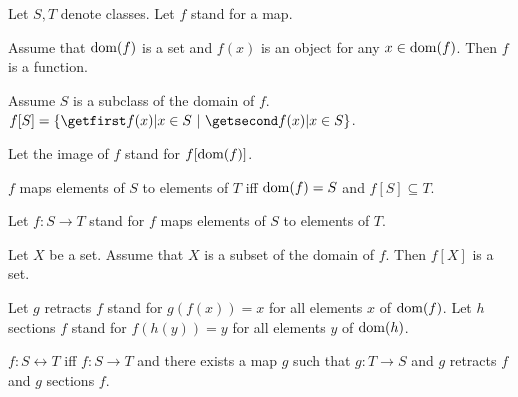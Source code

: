 \documentclass[english,11pt]{article}
\begin{document}
\begin{forthel}
  Let $S, T$ denote classes.
  Let $f$ stand for a map.

  \begin{axiom}
    Assume that $\operatorname{dom}(f)$ is a set and $f(x)$ is an object for any
    $x \in \operatorname{dom}(f)$.
    Then $f$ is a function.
  \end{axiom}

  \begin{definition}
    Assume $S$ is a subclass of the domain of $f$.
    $f[S] = \class{f(x) | x \in S}$.
  \end{definition}

  Let the image of $f$ stand for $f[\operatorname{dom}(f)]$.

  \begin{definition}
    $f$ maps elements of $S$ to elements of $T$ iff $\operatorname{dom}(f) = S$ and $f[S]
    \subseteq T$.
  \end{definition}

  Let $f : S \rightarrow T$ stand for $f$ maps elements of $S$ to elements of
  $T$.

  \begin{axiom}[title=Replacement Axiom]
    Let $X$ be a set.
    Assume that $X$ is a subset of the domain of $f$.
    Then $f[X]$ is a set.
  \end{axiom}

  Let $g$ retracts $f$ stand for $g(f(x)) = x$ for all elements $x$ of
  $\operatorname{dom}(f)$.
  Let $h$ sections $f$ stand for $f(h(y)) = y$ for all elements $y$ of
  $\operatorname{dom}(h)$.

  \begin{definition}
    $f : S \leftrightarrow T$ iff $f : S \rightarrow T$ and there exists a map
    $g$ such that $g : T \rightarrow S$ and $g$ retracts $f$ and $g$ sections
    $f$.
  \end{definition}
\end{forthel}
\end{document}
